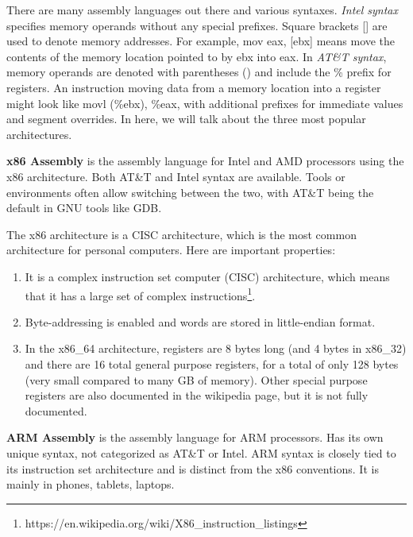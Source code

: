 There are many assembly languages out there and various syntaxes. \textit{Intel syntax} specifies memory operands without any special prefixes. Square brackets [] are used to denote memory addresses. For example, mov eax, [ebx] means move the contents of the memory location pointed to by ebx into eax. In \textit{AT\&T syntax}, memory operands are denoted with parentheses () and include the \% prefix for registers. An instruction moving data from a memory location into a register might look like movl (\%ebx), \%eax, with additional prefixes for immediate values and segment overrides. In here, we will talk about the three most popular architectures. 

\begin{definition}[x86]
  \label{def:x86}
  \textbf{x86 Assembly} is the assembly language for Intel and AMD processors using the x86 architecture. Both AT\&T and Intel syntax are available. Tools or environments often allow switching between the two, with AT\&T being the default in GNU tools like GDB.

  The x86 architecture is a CISC architecture, which is the most common architecture for personal computers. Here are important properties: 
  \begin{enumerate} 
    \item It is a complex instruction set computer (CISC) architecture, which means that it has a large set of complex instructions\footnote{https://en.wikipedia.org/wiki/X86\_instruction\_listings}. 
    \item Byte-addressing is enabled and words are stored in little-endian format.
    \item In the x86\_64 architecture, registers are 8 bytes long (and 4 bytes in x86\_32) and there are 16 total general purpose registers, for a total of only 128 bytes (very small compared to many GB of memory). Other special purpose registers are also documented in the wikipedia page, but it is not fully documented. 
  \end{enumerate}
\end{definition}

\begin{definition}[ARM]
  \label{def:arm}
  \textbf{ARM Assembly} is the assembly language for ARM processors. Has its own unique syntax, not categorized as AT\&T or Intel. ARM syntax is closely tied to its instruction set architecture and is distinct from the x86 conventions. It is mainly in phones, tablets, laptops. 
\end{definition}


